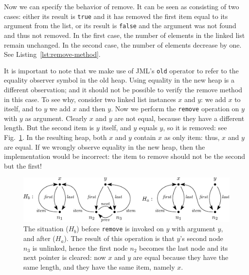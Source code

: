 \documentclass[runningheads]{llncs}
\def\bs{\char092}
\begin{document}
Now we can specify the behavior of remove. It can be seen as consisting of two cases: either its result is \texttt{true} and it has removed the first item equal to its argument from the list, or its result is \texttt{false} and the argument was not found and thus not removed. In the first case, the number of elements in the linked list remain unchanged. In the second case, the number of elements decrease by one. See Listing~\ref{lst:remove-method}.



It is important to note that we make use of JML's \texttt{\bs old} operator to refer to the equality observer symbol in the old heap. Using equality in the new heap is a different observation; and it should not be possible to verify the remove method in this case. To see why, consider two linked list instances $x$ and $y$: we add $x$ to itself, and to $y$ we add $x$ and then $y$. Now we perform the \texttt{remove} operation on $y$ with $y$ as argument. Clearly $x$ and $y$ are not equal, because they have a different length. But the second item is $y$ itself, and $y$ equals $y$, so it is removed: see Fig.~\ref{fig:remove-equals}. In the resulting heap, both $x$ and $y$ contain $x$ as only item: thus, $x$ and $y$ are equal. If we wrongly observe equality in the new heap, then the implementation would be incorrect: the item to remove should not be the second but the first!

\begin{figure}
   \centering
   \includegraphics[width=\textwidth]{figures/linkedlist-remove-equals.eps}
   \caption{The situation ($H_b$) before \texttt{remove} is invoked on $y$ with argument $y$, and after ($H_a$). The result of this operation is that $y$'s second node $n_3$ is unlinked, hence the first node $n_2$ becomes the last node and its next pointer is cleared: now $x$ and $y$ are equal because they have the same length, and they have the same item, namely $x$.}
   \vspace*{-12pt}
   \label{fig:remove-equals}
\end{figure}
\end{document}
